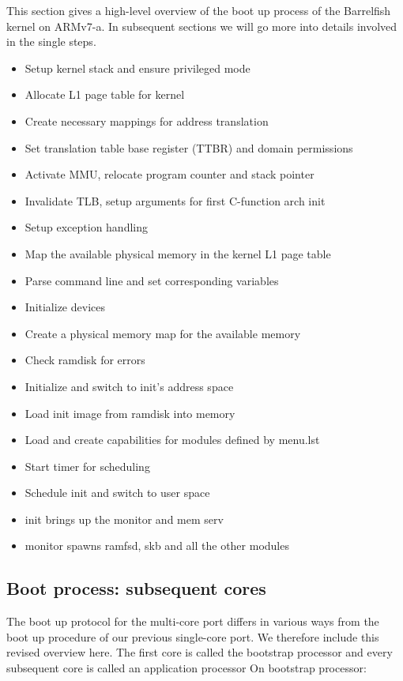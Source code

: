 \documentclass[a4paper,twoside]{report} %
\begin{document}
This section gives a high-level overview of the boot up process of the
Barrelfish
kernel on ARMv7-a. In subsequent sections we will go more into details
involved
in the single steps.
\begin{itemize}
\item Setup kernel stack and ensure privileged mode
\item Allocate L1 page table for kernel
\item Create necessary mappings for address translation
\item Set translation table base register (TTBR) and domain
  permissions
\item Activate MMU, relocate program counter and stack pointer
\item Invalidate TLB, setup arguments for first C-function arch init
\item Setup exception handling
\item Map the available physical memory in the kernel L1 page table
\item Parse command line and set corresponding variables
\item Initialize devices
\item Create a physical memory map for the available memory
\item Check ramdisk for errors
\item Initialize and switch to init’s address space
\item Load init image from ramdisk into memory
\item Load and create capabilities for modules defined by menu.lst
\item Start timer for scheduling
\item Schedule init and switch to user space
\item init brings up the monitor and mem serv
\item monitor spawns ramfsd, skb and all the other modules
\end{itemize}

\subsection{Boot process: subsequent cores}


The boot up protocol for the multi-core port differs in various ways
from the boot up procedure of our previous single-core port. We
therefore include this revised overview here. The first core is called
the bootstrap processor and every subsequent core is called an
application processor On bootstrap processor:
\end{document}
